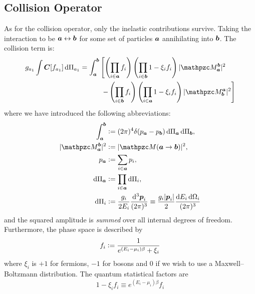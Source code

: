 \documentclass[
  a4paper,             %
  11pt,                %
  oneside,             %
  onecolumn,           %
  bibliography=totoc,  %
  final,               %
]{scrartcl}
\begin{document}
\subsection{Collision Operator}%
\label{sec:collision_operator}

As for the collision operator, only the inelastic contributions survive.  Taking
the interaction to be \(\boldsymbol{a} \leftrightarrow \boldsymbol{b}\) for some set of particles
\(\boldsymbol{a}\) annihilating into \(\boldsymbol{b}\).  The collision term is:
\begin{equation}
  \begin{aligned}
    g_{a_1} \int \vt C[f_{a_1}] \dd \Pi_{a_1}
    &= \int_{\vt a}^{\vt b} \left[ \left(\prod_{i \in \vt a} f_i\right) \left(\prod_{i \in \vt b} 1 - \xi_i f_i\right) \abs{\pzcM_{\vt a}^{\vt b}}^2 \right. \\
    &\quad\qquad \left. - \left(\prod_{i \in \vt b} f_i\right) \left(\prod_{i \in \vt a} 1 - \xi_i f_i\right) \abs{\pzcM_{\vt b}^{\vt a}}^2 \right]
  \end{aligned}
\end{equation}
where we have introduced the following abbreviations:
\begin{subequations}
  \begin{align}
    \int_{\vt a}^{\vt b} &\defeq (2\pi)^4 \delta(p_{\vt a} - p_{\vt b}) \dd \Pi_{\vt a} \dd \Pi_{\vt b}, \\
    \abs{\pzcM_{\vt a}^{\vt b}}^2 &\defeq \abs{\pzcM(\vt a \to \vt b)}^2, \\
    p_{\vt a} &\defeq \sum_{i \in \vt a} p_i, \\
    \dd \Pi_{\vt a} &\defeq \prod_{i \in \vt a} \dd \Pi_i, \\
    \dd \Pi_i &\defeq \frac{g_i}{2 E_i} \ddbar^3{\vt p_i} \equiv \frac{g_i \abs{\vt p_i}}{2} \frac{\dd E_i \dd \Omega_i}{(2 \pi)^3}
  \end{align}
\end{subequations}
and the squared amplitude is \emph{summed} over all internal degrees of freedom.
Furthermore, the phase space is described by
\begin{equation}
  f_i \vcentcolon= \frac{1}{e^{(E_i - \mu_i) \beta} + \xi_i}
\end{equation}
where \(\xi_i\) is \(+1\) for fermions, \(-1\) for bosons and \(0\) if we wish
to use a Maxwell--Boltzmann distribution.  The quantum statistical factors are
\begin{equation}
  1 - \xi_i f_i \equiv e^{(E_i - \mu_i) \beta} f_i
\end{equation}
\end{document}
